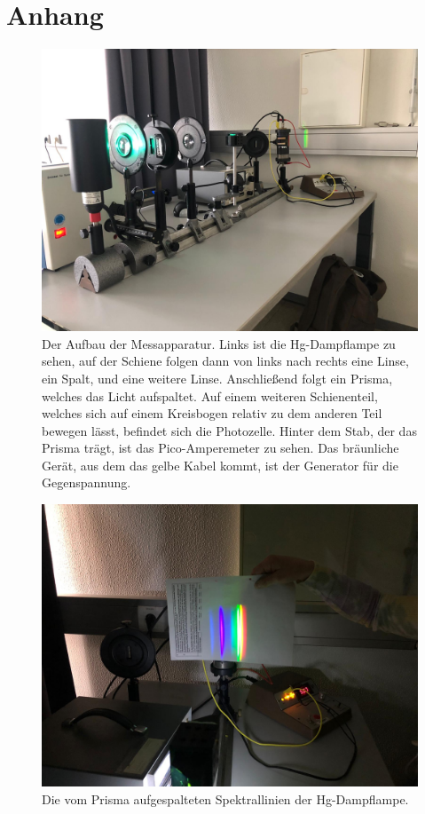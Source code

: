 \section{Anhang}
\begin{figure}
    \centering
    \includegraphics[width=\textwidth]{content/aufbaufotot.jpeg}
    \caption{Der Aufbau der Messapparatur. 
    Links ist die Hg-Dampflampe zu sehen, auf der Schiene folgen dann von links nach rechts eine Linse, ein Spalt, und eine weitere Linse.
    Anschließend folgt ein Prisma, welches das Licht aufspaltet.
    Auf einem weiteren Schienenteil, welches sich auf einem Kreisbogen relativ zu dem anderen Teil bewegen lässt, befindet sich die Photozelle.
    Hinter dem Stab, der das Prisma trägt, ist das Pico-Amperemeter zu sehen.
    Das bräunliche Gerät, aus dem das gelbe Kabel kommt, ist der Generator für die Gegenspannung.}
    \label{fig:fotoaufbau}
\end{figure}
\begin{figure}
    \centering
    \includegraphics[width=\textwidth]{content/farben.jpeg}
    \caption{Die vom Prisma aufgespalteten Spektrallinien der Hg-Dampflampe.}
    \label{fig:fotofarben}
\end{figure}
